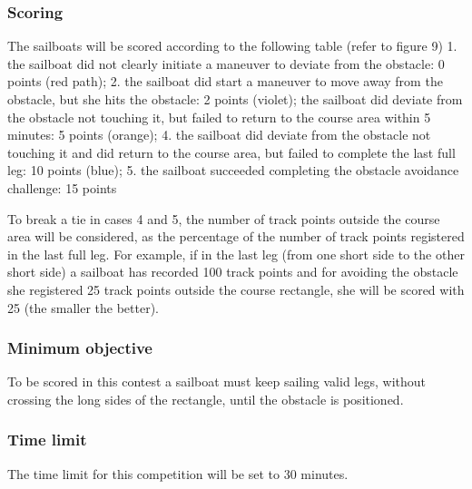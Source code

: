\documentclass[12pt]{article}
\begin{document}
\subsubsection{Scoring}
The sailboats will be scored according to the following table (refer to figure
9)
1. the sailboat did not clearly initiate a maneuver to deviate from the
obstacle: 0 points (red
path);
2. the sailboat did start a maneuver to move away from the obstacle, but she
hits the obstacle: 2
points (violet);
the sailboat did deviate from the obstacle not touching it, but failed to return
to the course
area within 5 minutes: 5 points (orange);
4. the sailboat did deviate from the obstacle not touching it and did return to
the course area,
but failed to complete the last full leg: 10 points (blue);
5. the sailboat succeeded completing the obstacle avoidance challenge: 15 points

To break a tie in cases 4 and 5, the number of track points outside the course
area will be
considered, as the percentage of the number of track points registered in the
last full leg. For
example, if in the last leg (from one short side to the other short side) a
sailboat has recorded
100 track points and for avoiding the obstacle she registered 25 track points
outside the
course rectangle, she will be scored with 25 (the smaller the better).

\subsubsection{Minimum objective}
To be scored in this contest a sailboat must keep sailing valid legs, without
crossing the long
sides of the rectangle, until the obstacle is positioned.

\subsubsection{Time limit}
The time limit for this competition will be set to 30 minutes.
\end{document}
